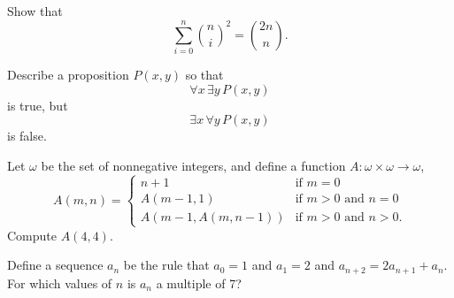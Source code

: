 \documentclass[12pt]{midterm}
\begin{document}
\begin{exam}
\begin{problem}[350]
Show that
$$
\sum_{i=0}^n \binom{n}{i}^2 = \binom{2n}{n}.
$$

\end{problem}

\begin{solution}\begin{solutiontext}
\end{solutiontext}\end{solution}

\begin{problem}[350]
Describe a proposition $P(x,y)$ so that
$$ \forall x \, \exists y\, P(x,y) $$
is true, but
$$ \exists x \, \forall y\, P(x,y) $$
is false.
\end{problem}

\begin{solution}\begin{solutiontext}
\end{solutiontext}\end{solution}

\begin{problem}[350]
Let $\omega$ be the set of nonnegative integers, and define a function
$A : \omega \times \omega \to \omega$,
$$
 A(m, n) =
\begin{cases}
n+1 & \mbox{if } m = 0 \\
A(m-1, 1) & \mbox{if } m > 0 \mbox{ and } n = 0 \\
A(m-1, A(m, n-1)) & \mbox{if } m > 0 \mbox{ and } n > 0.
\end{cases}
$$
Compute $A(4,4)$.
\end{problem}

\begin{solution}\begin{solutiontext}
\end{solutiontext}\end{solution}

\begin{problem}[350]
Define a sequence $a_n$ be the rule that $a_0 = 1$ and $a_1 = 2$ and
$a_{n+2} = 2 a_{n+1} + a_n$.  For which values of $n$ is $a_n$ a
multiple of 7?
\end{problem}


\end{exam}
\end{document}
